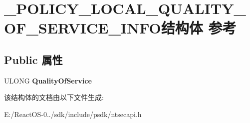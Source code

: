 \hypertarget{struct___p_o_l_i_c_y___l_o_c_a_l___q_u_a_l_i_t_y___o_f___s_e_r_v_i_c_e___i_n_f_o}{}\section{\+\_\+\+P\+O\+L\+I\+C\+Y\+\_\+\+L\+O\+C\+A\+L\+\_\+\+Q\+U\+A\+L\+I\+T\+Y\+\_\+\+O\+F\+\_\+\+S\+E\+R\+V\+I\+C\+E\+\_\+\+I\+N\+F\+O结构体 参考}
\label{struct___p_o_l_i_c_y___l_o_c_a_l___q_u_a_l_i_t_y___o_f___s_e_r_v_i_c_e___i_n_f_o}
\subsection*{Public 属性}
\begin{DoxyCompactItemize}
\item 
\mbox{\label{struct___p_o_l_i_c_y___l_o_c_a_l___q_u_a_l_i_t_y___o_f___s_e_r_v_i_c_e___i_n_f_o_acf55bcc0d2e02c9373b636e5e77be17e}} 
U\+L\+O\+NG {\bfseries Quality\+Of\+Service}
\end{DoxyCompactItemize}


该结构体的文档由以下文件生成\+:\begin{DoxyCompactItemize}
\item 
E\+:/\+React\+O\+S-\/0../sdk/include/psdk/ntsecapi.\+h\end{DoxyCompactItemize}
